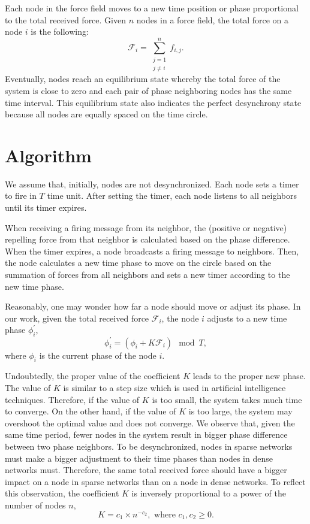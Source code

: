 Each node in the force field moves to a new time position or phase proportional to the total received force.
Given $n$ nodes in a force field, the total force on a node $i$ is the following:
\begin{equation}
\mathcal{F}_i = \sum_{\substack{j=1\\ j \neq i}}^{n}{f_{i,j}}.
\label{eq:fsum}
\end{equation}
Eventually, nodes reach an equilibrium state whereby the total force of the system is close to zero and each pair of phase neighboring nodes has the same time interval.
This equilibrium state also indicates the perfect desynchrony state because all nodes are equally spaced on the time circle.

\section{Algorithm}
\label{sec:algo}
We assume that, initially, nodes are not desynchronized. 
Each node sets a timer to fire in $T$ time unit.
After setting the timer, each node listens to all neighbors until its timer expires.

When receiving a firing message from its neighbor, the (positive or negative) repelling force from that neighbor is calculated based on the phase difference.
When the timer expires, a node broadcasts a firing message to neighbors. 
Then, the node calculates a new time phase to move on the circle based on the summation of forces from all neighbors and sets a new timer according to the new time phase.

Reasonably, one may wonder how far a node should move or adjust its phase.
In our work, given the total received force $\mathcal{F}_i$, the node $i$ adjusts to a new time phase $\phi_i^{'}$,
\begin{equation}
\phi_i^{'} = (\phi_i + K\mathcal{F}_i) \mod T,
\label{eq:newphase}
\end{equation} 
where $\phi_i$ is the current phase of the node $i$.

Undoubtedly, the proper value of the coefficient $K$ leads to the proper new phase.
The value of $K$ is similar to a step size which is used in artificial intelligence techniques. 
Therefore, if the value of $K$ is too small, the system takes much time to converge. 
On the other hand, if the value of $K$ is too large, the system may overshoot the optimal value and does not converge. 
We observe that, given the same time period, fewer nodes in the system result in bigger phase difference between two phase neighbors. To be desynchronized, nodes in sparse networks must make a bigger adjustment to their time phases than nodes in dense networks must.
Therefore, the same total received force should have a bigger impact on a node in sparse networks than on a node in dense networks. 
To reflect this observation, the coefficient $K$ is inversely proportional to a power of the number of nodes $n$,
\begin{equation}
K = c_1 \times n^{-c_2}, \text{ where } c_1, c_2 \geq 0.
\end{equation}


